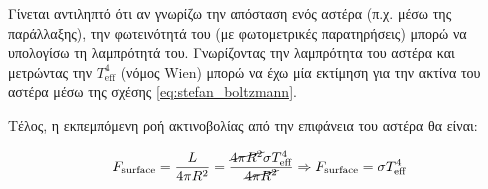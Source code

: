 Γίνεται αντιληπτό ότι αν γνωρίζω την απόσταση ενός αστέρα (π.χ. μέσω της παράλλαξης), την φωτεινότητά του (με φωτομετρικές παρατηρήσεις) μπορώ να υπολογίσω τη λαμπρότητά του. Γνωρίζοντας την λαμπρότητα του αστέρα και μετρώντας την $T_{\text{eff}}^4$ (νόμος Wien) μπορώ να έχω μία εκτίμηση για την ακτίνα του αστέρα μέσω της σχέσης \eqref{eq:stefan_boltzmann}.

Τέλος, η εκπεμπόμενη ροή ακτινοβολίας από την επιφάνεια του αστέρα θα είναι:

\begin{eqnarray}
    F_{\text{surface}} = \frac{L}{4 \pi R^2} = \frac{\cancel{4 \pi R^2} \sigma T_{\text{eff}}^4}{\cancel{4 \pi R^2}} \Rightarrow F_{\text{surface}} = \sigma T_{\text{eff}}^4
\end{eqnarray}